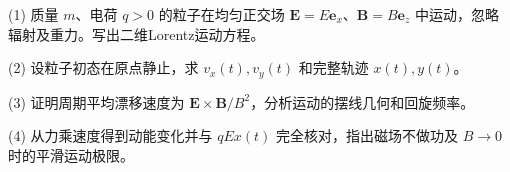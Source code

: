 (1) 质量 \(m\)、电荷 \(q>0\) 的粒子在均匀正交场 \(\mathbf E=E\mathbf e_x\)、\(\mathbf B=B\mathbf e_z\) 中运动，忽略辐射及重力。写出二维Lorentz运动方程。

(2) 设粒子初态在原点静止，求 \(v_x(t),v_y(t)\) 和完整轨迹 \(x(t),y(t)\)。

(3) 证明周期平均漂移速度为 \(\mathbf E\times\mathbf B/B^2\)，分析运动的摆线几何和回旋频率。

(4) 从力乘速度得到动能变化并与 \(qE x(t)\) 完全核对，指出磁场不做功及 \(B\to0\) 时的平滑运动极限。
